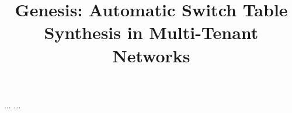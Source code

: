 \documentclass[preprint]{sigplanconf}
\newif\iffull
\begin{document}
%



\iffull
\title{Genesis: Automatic Switch Table Synthesis in Multi-Tenant Networks}
\else
\title{Genesis: Automatic Switch Table Synthesis in Multi-Tenant Networks}
\fi


{...}
{...}

\maketitle














%
%


%





\iffull

\fi
\end{document}
